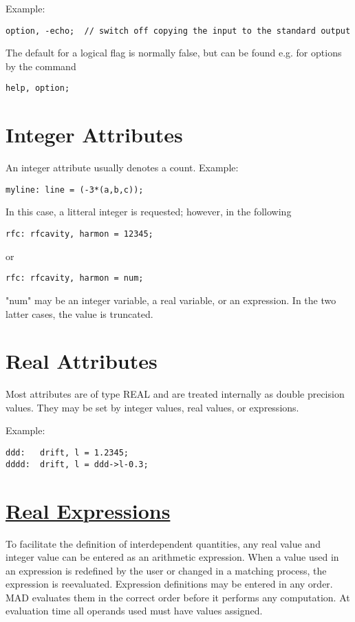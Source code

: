 Example: 
\begin{verbatim}
option, -echo;  // switch off copying the input to the standard output
\end{verbatim} 

The default for a logical flag is normally false, but can be found e.g. for options by the command  
\begin{verbatim}
help, option;
\end{verbatim}


%
\section{Integer Attributes}
\label{sec:integer}
An integer attribute usually denotes a count. Example: 
\begin{verbatim}
myline: line = (-3*(a,b,c));
\end{verbatim} 

In this case, a litteral integer is requested; however, in the following 
\begin{verbatim}
rfc: rfcavity, harmon = 12345;
\end{verbatim} 

or 
\begin{verbatim}
rfc: rfcavity, harmon = num;
\end{verbatim} 

"num" may be an integer variable, a real variable, or an expression.  In
the two latter cases, the value is truncated. 



%
\section{Real Attributes}
\label{sec:real}
Most attributes are of type REAL and are treated internally as double
precision values. They may be set by integer values, real values,  or
expressions. 

Example:  
\begin{verbatim}
ddd:   drift, l = 1.2345;
dddd:  drift, l = ddd->l-0.3;
\end{verbatim}


%
\section{\href{expression}{Real Expressions}}
\label{sec:expression}
To facilitate the definition of interdependent quantities, any real
value and integer value can be entered as an arithmetic expression. When
a value used in an expression is redefined by the user or changed in a
matching process, the expression is reevaluated. Expression definitions
may be entered in any order. MAD evaluates them in the correct order
before it performs any computation. At evaluation time all operands used
must have values assigned.  

